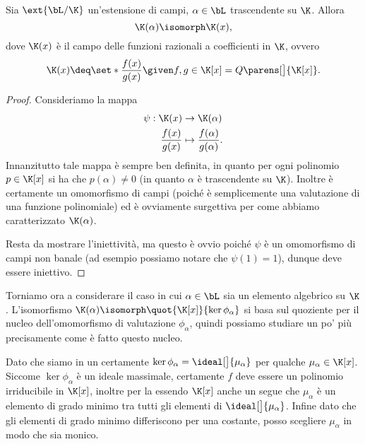 \begin{proposition}
    {}{}
    Sia $\ext{\bL / \K}$ un'estensione di campi, $\alpha \in \bL$ trascendente su $\K$. Allora \[
        \K(\alpha) \isomorph \K(x),
    \] dove $\K(x)$ è il campo delle funzioni razionali a coefficienti in $\K$, ovvero \[
        \K(x) \deq \set*{\frac{f(x)}{g(x)} \given f, g \in \K[x]} = Q\parens[\big]{\K[x]}.
    \] 
\end{proposition}
\begin{proof}
    Consideriamo la mappa \begin{align*}
        \psi : \K(x) &\to \K(\alpha)\\
        \frac{f(x)}{g(x)} &\mapsto \frac{f(\alpha)}{g(\alpha)}.
    \end{align*} Innanzitutto tale mappa è sempre ben definita, in quanto per ogni polinomio $p \in \K[x]$ si ha che $p(\alpha) \neq 0$ (in quanto $\alpha$ è trascendente su $\K$). Inoltre è certamente un omomorfismo di campi (poiché è semplicemente una valutazione di una funzione polinomiale) ed è ovviamente surgettiva per come abbiamo caratterizzato $\K(\alpha)$.
    
    Resta da mostrare l'iniettività, ma questo è ovvio poiché $\psi$ è un omomorfismo di campi non banale (ad esempio possiamo notare che $\psi(1) = 1$), dunque deve essere iniettivo.
\end{proof}

Torniamo ora a considerare il caso in cui $\alpha \in \bL$ sia un elemento algebrico su $\K$. L'isomorfismo $\K(\alpha) \isomorph \quot{\K[x]}{\ker \phi_\alpha}$ si basa sul quoziente per il nucleo dell'omomorfismo di valutazione $\phi_\alpha$, quindi possiamo studiare un po' più precisamente come è fatto questo nucleo.

Dato che siamo in un \PID certamente $\ker \phi_\alpha = \ideal[\big]{\mu_\alpha}$ per qualche $\mu_\alpha \in \K[x]$. Siccome $\ker \phi_\alpha$ è un ideale massimale, certamente $f$ deve essere un polinomio irriducibile in $\K[x]$, inoltre per la  essendo $\K[x]$ anche un \ED segue che $\mu_\alpha$ è un elemento di grado minimo tra tutti gli elementi di $\ideal[\big]{\mu_\alpha}$. Infine dato che gli elementi di grado minimo differiscono per una costante, posso scegliere $\mu_\alpha$ in modo che sia monico.

